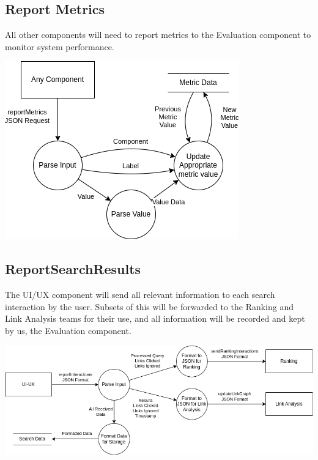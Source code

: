 \subsection*{Report Metrics}

All other components will need to report metrics to the Evaluation component to monitor system performance.

\begin{center}
  \includegraphics[scale=0.7]{DFDs/LowLevelDFDs-ReportMetric.drawio.png}
\end{center}

\newpage
\subsection*{ReportSearchResults}

The UI/UX component will send all relevant information to each search interaction by the user. Subsets of this will be forwarded to the Ranking and Link Analysis teams for their use, and all information will be recorded and kept by us, the Evaluation component.

\begin{center}
  \includegraphics[scale=0.55]{DFDs/LowLevelDFDs-ReportSearchResults.drawio.png}
\end{center}